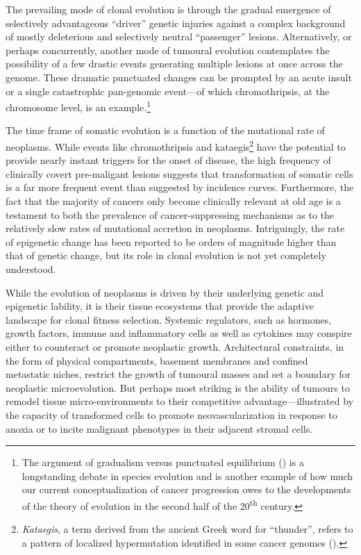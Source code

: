 The prevailing mode of clonal evolution is through the gradual emergence of
selectively advantageous ``driver'' genetic injuries against a complex
background of mostly deleterious and selectively neutral ``passenger'' lesions.
Alternatively, or perhaps concurrently, another mode of tumoural evolution
contemplates the possibility of a few drastic events generating multiple lesions
at once across the genome.  These dramatic punctuated changes can be prompted by
an acute insult or a single catastrophic pan-genomic event---of which
chromothripsis, at the chromosome level, is an
example.\cite{stephens_massive_2011}\footnote{The argument of gradualism versus
  punctuated equilibrium (\citealp{gould_punctuated_1993}) is a longstanding
  debate in species evolution and is another example of how much our current
  conceptualization of cancer progression owes to the developments of the theory
  of evolution in the second half of the 20\textsuperscript{th} century.}

The time frame of somatic evolution is a function of the mutational rate of
neoplasms.  While events like chromothripsis and
kataegis\footnote{\emph{Kataegis}, a term derived from the ancient Greek word
  for ``thunder'', refers to a pattern of localized hypermutation identified in
  some cancer genomes (\mbox{\citealp{nik-zainal_mutational_2012}}).} have the
potential to provide nearly instant triggers for the onset of disease, the high
frequency of clinically covert \mbox{pre-maligant}
lesions\cite{sakr_frequency_1993} suggests that transformation of somatic cells
is a far more frequent event than suggested by incidence curves.  Furthermore, the
fact that the majority of cancers only become clinically relevant at old age is
a testament to both the prevalence of cancer-suppressing mechanisms as to the
relatively slow rates of mutational accretion in neoplasms.  Intriguingly, the
rate of epigenetic change has been reported to be orders of magnitude higher
than that of genetic change,\cite{siegmund_inferring_2009} but its role in
clonal evolution is not yet completely understood.


While the evolution of neoplasms is driven by their underlying genetic and
epigenetic lability, it is their tissue ecosystems that provide the adaptive
landscape for clonal fitness selection.\cite{greaves_clonal_2012} Systemic
regulators, such as hormones, growth factors, immune and inflammatory cells as
well as cytokines may conspire either to counteract or promote neoplastic
growth.\cite{bierie_tumour_2006,hanahan_hallmarks_2011} Architectural
constraints, in the form of physical compartments, basement membranes and
confined metastatic niches, restrict the growth of tumoural masses and set a
boundary for neoplastic microevolution.  But perhaps most striking is the
ability of tumours to remodel tissue micro-environments to their competitive
advantage---illustrated by the capacity of transformed cells to promote
neovascularization in response to anoxia or to incite malignant phenotypes in
their adjacent stromal cells.\cite{lathia_deadly_2011}

